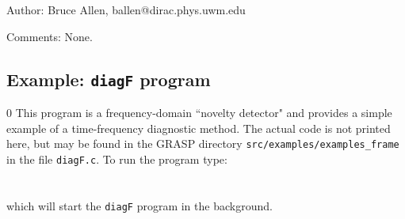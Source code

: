 
\begin{description}
\item{Author:}
Bruce Allen, ballen@dirac.phys.uwm.edu
\item{Comments:}
None.
\end{description}
\clearpage

\subsection{Example: {\tt diagF} program}
\setcounter{equation}0
This program is a frequency-domain ``novelty detector" and provides a
simple example of a time-frequency diagnostic method.  
The actual code is not printed here, but may be found in the GRASP directory
\linebreak[4]
\texttt{src/examples/examples\_frame} in the file {\tt diagF.c}. To run the
program type:\\
\\
 \\
which will start the {\tt diagF} program in the background.

